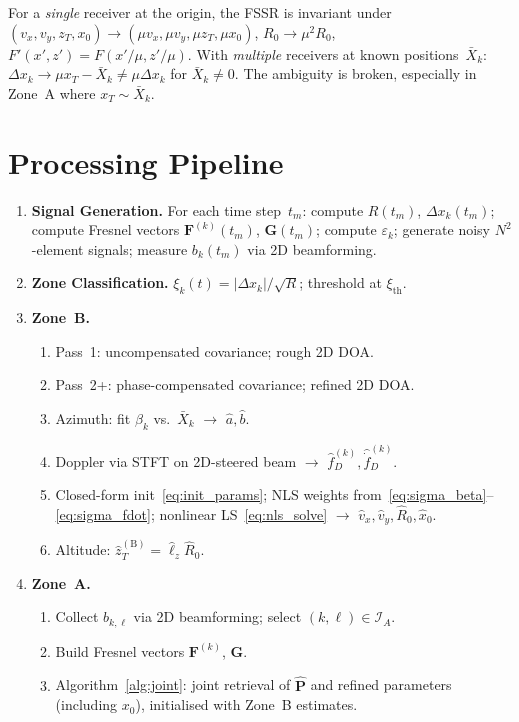 \documentclass[11pt,a4paper]{article}
\begin{document}
For a \emph{single} receiver at the origin, the FSSR is invariant
under $(v_x,v_y,z_T,x_0)\to(\mu v_x,\mu v_y,\mu z_T,\mu x_0)$,
$R_0\to\mu^2R_0$, $F'(x',z')=F(x'/\mu,z'/\mu)$.  With
\emph{multiple} receivers at known positions~$\bar{X}_k$:
$\Delta x_k\to\mu x_T-\bar{X}_k\ne\mu\Delta x_k$ for
$\bar{X}_k\ne 0$.  The ambiguity is broken, especially in Zone~A
where $x_T\sim\bar{X}_k$.

\section{Processing Pipeline}
\label{sec:pipeline}

\begin{enumerate}
  \item \textbf{Signal Generation.}
    For each time step~$t_m$: compute $R(t_m)$,
    $\Delta x_k(t_m)$; compute Fresnel vectors
    $\mathbf{F}^{(k)}(t_m)$, $\mathbf{G}(t_m)$; compute
    $\varepsilon_k$; generate noisy $N^2$-element signals; measure
    $b_k(t_m)$ via 2D beamforming.

  \item \textbf{Zone Classification.}
    $\xi_k(t)=|\Delta x_k|/\sqrt{R}$; threshold at
    $\xi_{\mathrm{th}}$.

  \item \textbf{Zone~B.}
    \begin{enumerate}
      \item Pass~1: uncompensated covariance; rough 2D DOA.
      \item Pass~2+: phase-compensated covariance; refined 2D DOA.
      \item Azimuth: fit $\beta_k$ vs.\ $\bar{X}_k$
        $\to$ $\hat{a},\hat{b}$.
      \item Doppler via STFT on 2D-steered beam $\to$
        $\hat{f}_D^{(k)},\hat{\dot{f}}_D^{(k)}$.
      \item Closed-form init~\eqref{eq:init_params};
        NLS weights from~\eqref{eq:sigma_beta}--\eqref{eq:sigma_fdot};
        nonlinear LS~\eqref{eq:nls_solve} $\to$
        $\hat{v}_x,\hat{v}_y,\hat{R}_0,\hat{x}_0$.
      \item Altitude: $\hat{z}_T^{(\mathrm{B})}
        =\hat{\ell}_z\hat{R}_0$.
    \end{enumerate}

  \item \textbf{Zone~A.}
    \begin{enumerate}
      \item Collect $b_{k,\ell}$ via 2D beamforming; select
        $(k,\ell)\in\mathcal{I}_A$.
      \item Build Fresnel vectors $\mathbf{F}^{(k)}$, $\mathbf{G}$.
      \item Algorithm~\ref{alg:joint}: joint retrieval of
        $\hat{\mathbf{P}}$ and refined parameters (including $x_0$),
        initialised with Zone~B estimates.
    \end{enumerate}


\end{enumerate}
\end{document}
